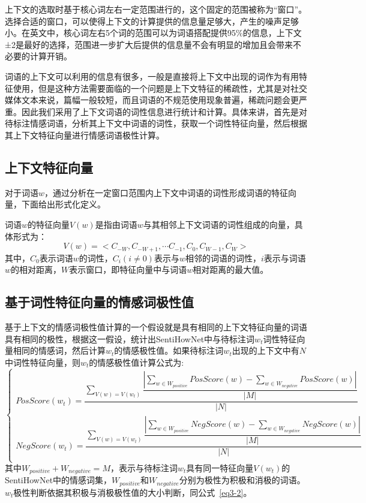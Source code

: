 上下文的选取时基于核心词左右一定范围进行的，这个固定的范围被称为“窗口”。选择合适的窗口，可以使得上下文的计算提供的信息量足够大，产生的噪声足够小。在英文中，核心词左右5个词的范围可以为词语搭配提供95\%的信息，上下文±2是最好的选择，范围进一步扩大后提供的信息量不会有明显的增加且会带来不必要的计算开销。

词语的上下文可以利用的信息有很多，一般是直接将上下文中出现的词作为有用特征使用，但是这种方法需要面临的一个问题是上下文特征的稀疏性，尤其是对社交媒体文本来说，篇幅一般较短，而且词语的不规范使用现象普遍，稀疏问题会更严重。因此我们采用了上下文词语的词性信息进行统计和计算。具体来讲，首先是对待标注情感词语，分析其上下文中词语的词性，获取一个词性特征向量，然后根据其上下文特征向量进行情感词语极性计算。

\subsection{上下文特征向量}
对于词语$w$，通过分析在一定窗口范围内上下文中词语的词性形成词语的特征向量，下面给出形式化定义。
\begin{definition}
词语$w$的特征向量$V(w)$是指由词语$w$与其相邻上下文词语的词性组成的向量，具体形式为：
$$V(w)=<C_{-W},C_{-W+1},\cdots C_{-1},C_0,C_{W-1},C_W>$$
其中，$C_0$表示词语$w$的词性，$C_i(i\neq 0)$表示与$w$相邻的词语的词性，$i$表示与词语$w$的相对距离，$W$表示窗口，即特征向量中与词语$w$相对距离的最大值。
\end{definition}

\subsection{基于词性特征向量的情感词极性值}
基于上下文的情感词极性值计算的一个假设就是具有相同的上下文特征向量的词语具有相同的极性，根据这一假设，统计出SentiHowNet中与待标注词$ w_t$词性特征向量相同的情感词，然后计算$ w_t $的情感极性值。如果待标注词$ w_t$出现的上下文中有$ N $中词性特征向量，则$ w_t$的情感极性值计算公式为:
\begin{equation}
\label{eq3-2-1}
\begin{cases}
PosScore(w_t)=\dfrac{\sum_{V(w)=V(w_t)}\dfrac{|\sum_{w \in W_{positive}}PosScore(w)-\sum_{w \in W_{negative}}PosScore(w)|}{|M|}}{|N|} \\
NegScore(w_t)=\dfrac{\sum_{V(w)=V(w_t)}\dfrac{|\sum_{w \in W_{positive}}NegScore(w)-\sum_{w \in W_{negative}}NegScore(w)|}{|M|}}{|N|} \\
\end{cases}
\end{equation}
其中$W_{positive}+W_{negative}=M$，表示与待标注词$w_t$具有同一特征向量$ V(w_t) $的SentiHowNet中的情感词集，$W_{positive}$和$W_{negative}$分别为极性为积极和消极的词语。$w_t$极性判断依据其积极与消极极性值的大小判断，同公式~\ref{eq3-2}。

